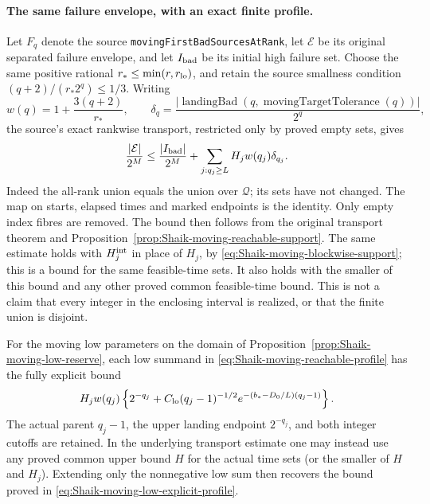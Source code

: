 \paragraph{The same failure envelope, with an exact finite profile.}
Let \(F_q\) denote the source \texttt{movingFirstBadSourcesAtRank},
let \(\mathcal E\) be its original separated failure envelope, and let
\(I_{\rm bad}\) be its initial high failure set. Choose the same
positive rational \(r_*\le\min(r,r_{\rm lo})\), and retain the
source smallness condition \((q+2)/(r_*2^q)\le1/3\).
Writing
\[
 w(q)=1+\frac{3(q+2)}{r_*},\qquad
 \delta_q=\frac{|\operatorname{landingBad}
             (q,\operatorname{movingTargetTolerance}(q))|}{2^q},
\]
the source's exact rankwise transport, restricted only by proved
empty sets, gives
\begin{equation}\label{eq:Shaik-moving-reachable-profile}
 \frac{|\mathcal E|}{2^M}
 \le\frac{|I_{\rm bad}|}{2^M}
       +\sum_{j:q_j\ge L} H_j w(q_j)\delta_{q_j}.
\end{equation}
Indeed the all-rank union equals the union over \(\mathcal Q\);
its sets have not changed. The map on starts, elapsed times and
marked endpoints is the identity. Only empty index fibres are
removed. The bound then follows from the original transport theorem
and Proposition~\ref{prop:Shaik-moving-reachable-support}.
The same estimate holds with \(H_j^{\rm int}\) in place of \(H_j\),
by \eqref{eq:Shaik-moving-blockwise-support}; this is a bound for the
same feasible-time sets. It also holds with the smaller of this bound
and any other proved common feasible-time bound.
This is not a claim that every integer in the enclosing interval
is realized, or that the finite union is disjoint.

For the moving low parameters on the domain of
Proposition~\ref{prop:Shaik-moving-low-reserve}, each low summand
in \eqref{eq:Shaik-moving-reachable-profile} has the fully explicit bound
\[
 H_jw(q_j)\left\{2^{-q_j}
  +C_{\rm lo}(q_j-1)^{-1/2}
       e^{-(b_*-D_0/L)(q_j-1)}\right\}.
\]
The actual parent \(q_j-1\), the upper landing endpoint \(2^{-q_j}\),
and both integer cutoffs are retained. In the underlying transport
estimate one may instead use any proved common upper bound \(H\)
for the actual time sets (or the smaller of \(H\) and \(H_j\)).
Extending only the nonnegative low sum then recovers the bound proved in
\eqref{eq:Shaik-moving-low-explicit-profile}.

